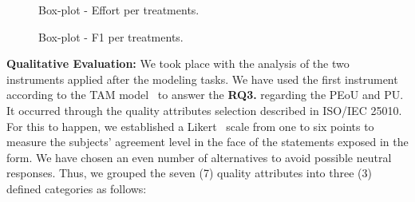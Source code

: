 \begin{figure}[!htb]
        \centering
        \caption{Box-plot - Effort per treatments.}
        \label{fig:boxplotTempo1}
        
\end{figure}

\begin{figure}[!htb]
        \centering
        \caption{Box-plot - F1 per treatments.}
        \label{fig:boxplotMedidaF1}
        
\end{figure}

%     

\textbf{Qualitative Evaluation:} 
We took place with the analysis of the two instruments applied after the modeling tasks.
We have used the first instrument according to the TAM model~\cite{Davis:1989,Persico:2014} to answer the \textbf{RQ3.} regarding the PEoU and PU.
It occurred through the quality attributes selection described in ISO/IEC 25010.
For this to happen, we established a Likert~\cite{Likert} scale from one to six points to measure the subjects' agreement level in the face of the statements exposed in the form.
We have chosen an even number of alternatives to avoid possible neutral responses.
Thus, we grouped the seven (7) quality attributes into three (3) defined categories as follows:

